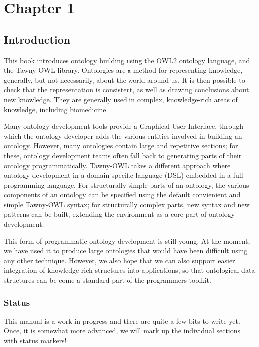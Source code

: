 \chapter{Chapter 1}

\section{Introduction}
\label{sec-1}

This book introduces ontology building using the OWL2 ontology language, and
the Tawny-OWL library. Ontologies are a method for representing knowledge,
generally, but not necessarily, about the world around us. It is then possible
to check that the representation is consistent, as well as drawing conclusions
about new knowledge. They are generally used in complex, knowledge-rich areas
of knowledge, including biomedicine.

Many ontology development tools provide a Graphical User Interface, through
which the ontology developer adds the various entities involved in building an
ontology. However, many ontologies contain large and repetitive sections; for
these, ontology development teams often fall back to generating parts of their
ontology programmatically. Tawny-OWL takes a different approach where ontology
development in a domain-specific language (DSL) embedded in a full programming
language. For structurally simple parts of an ontology, the various components
of an ontology can be specified using the default convienient and simple
Tawny-OWL syntax; for structurally complex parts, new syntax and new patterns
can be built, extending the environment as a core part of ontology
development.


This form of programmatic ontology development is still young. At the moment,
we have used it to produce large ontologies that would have been difficult
using any other technique. However, we also hope that we can also support
easier integration of knowledge-rich structures into applications, so that
ontological data structures can be come a standard part of the programmers
toolkit.


\subsection{Status}
\label{sec-1-1}

This manual is a work in progress and there are quite a few bits to write yet.
Once, it is somewhat more advanced, we will mark up the individual sections
with status markers!

